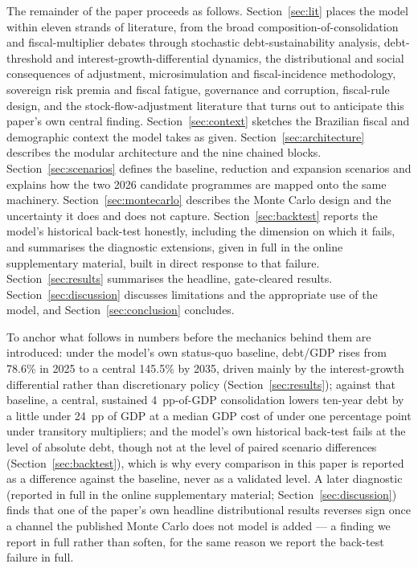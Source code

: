 \documentclass[11pt,a4paper]{article}
\begin{document}
The remainder of the paper proceeds as follows. Section~\ref{sec:lit} places the model within eleven strands of literature, from the broad composition-of-consolidation and fiscal-multiplier debates through stochastic debt-sustainability analysis, debt-threshold and interest-growth-differential dynamics, the distributional and social consequences of adjustment, microsimulation and fiscal-incidence methodology, sovereign risk premia and fiscal fatigue, governance and corruption, fiscal-rule design, and the stock-flow-adjustment literature that turns out to anticipate this paper's own central finding. Section~\ref{sec:context} sketches the Brazilian fiscal and demographic context the model takes as given. Section~\ref{sec:architecture} describes the modular architecture and the nine chained blocks. Section~\ref{sec:scenarios} defines the baseline, reduction and expansion scenarios and explains how the two 2026 candidate programmes are mapped onto the same machinery. Section~\ref{sec:montecarlo} describes the Monte Carlo design and the uncertainty it does and does not capture. Section~\ref{sec:backtest} reports the model's historical back-test honestly, including the dimension on which it fails, and summarises the diagnostic extensions, given in full in the online supplementary material, built in direct response to that failure. Section~\ref{sec:results} summarises the headline, gate-cleared results. Section~\ref{sec:discussion} discusses limitations and the appropriate use of the model, and Section~\ref{sec:conclusion} concludes.

To anchor what follows in numbers before the mechanics behind them are introduced: under the model's own status-quo baseline, debt/GDP rises from 78.6\% in 2025 to a central 145.5\% by 2035, driven mainly by the interest-growth differential rather than discretionary policy (Section~\ref{sec:results}); against that baseline, a central, sustained 4~pp-of-GDP consolidation lowers ten-year debt by a little under 24~pp of GDP at a median GDP cost of under one percentage point under transitory multipliers; and the model's own historical back-test fails at the level of absolute debt, though not at the level of paired scenario differences (Section~\ref{sec:backtest}), which is why every comparison in this paper is reported as a difference against the baseline, never as a validated level. A later diagnostic (reported in full in the online supplementary material; Section~\ref{sec:discussion}) finds that one of the paper's own headline distributional results reverses sign once a channel the published Monte Carlo does not model is added --- a finding we report in full rather than soften, for the same reason we report the back-test failure in full.
\end{document}
